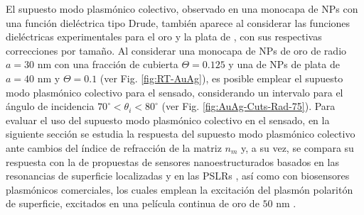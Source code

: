 El supuesto modo plasmónico colectivo, observado en una monocapa de NPs con una función dieléctrica tipo Drude, también aparece al considerar las funciones dieléctricas experimentales para el oro y la plata de \cite{johnson1972constants}, con sus respectivas correcciones por tamaño. Al considerar una monocapa de NPs de oro de radio $a=30$ nm con una fracción de cubierta $\Theta=0.125$ y una de NPs de plata de $a=40$ nm y $\Theta=0.1$ (ver Fig. \ref{fig:RT-AuAg}), es posible emplear el supuesto modo plasmónico colectivo para el sensado, considerando un intervalo para el ángulo de incidencia $70^\circ<\theta_i<80^\circ$ (ver Fig. \ref{fig:AuAg-Cuts-Rad-75}). Para evaluar el uso del supuesto modo plasmónico colectivo en el sensado, en la siguiente sección se estudia la respuesta del supuesto modo plasmónico colectivo ante cambios del índice de refracción de la matriz $n_m$ y, a su vez, se compara su respuesta con la de propuestas de sensores nanoestructurados basados en las resonancias de superficie localizadas \cite{svedendahl2009refractometric} y en las PSLRs \cite{danilov2018ultra}, así como con  biosensores plasmónicos comerciales, los cuales emplean la excitación del plasmón polaritón de superficie, excitados en una película continua de oro de $50$ nm \cite{estevez2014trends,svedendahl2009refractometric}.